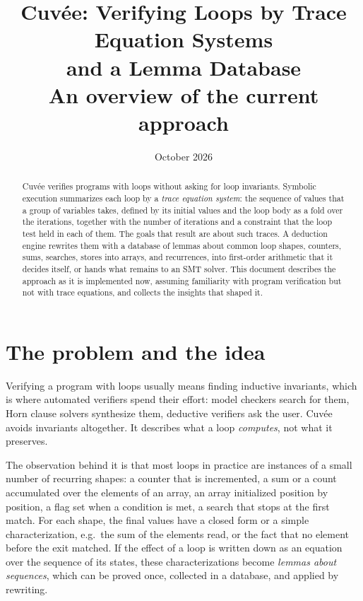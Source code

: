\documentclass[a4paper,11pt]{article}
\title{Cuvée: Verifying Loops by Trace Equation Systems\\and a Lemma Database\\[0.5ex]\large An overview of the
current approach}
\date{October 2026}
\newcommand{\cuvee}{Cuvée}
\begin{document}
\maketitle

\begin{abstract}
\cuvee{} verifies programs with loops without asking for loop invariants. Symbolic execution summarizes each loop
by a \emph{trace equation system}: the sequence of values that a group of variables takes, defined by its initial
values and the loop body as a fold over the iterations, together with the number of iterations and a constraint
that the loop test held in each of them. The goals that result are about such traces. A deduction engine rewrites
them with a database of lemmas about common loop shapes, counters, sums, searches, stores into arrays, and
recurrences, into first-order arithmetic that it decides itself, or hands what remains to an SMT solver. This
document describes the approach as it is implemented now, assuming familiarity with program verification but not
with trace equations, and collects the insights that shaped it.
\end{abstract}

\section{The problem and the idea}

Verifying a program with loops usually means finding inductive invariants, which is where automated verifiers
spend their effort: model checkers search for them, Horn clause solvers synthesize them, deductive verifiers ask the
user. \cuvee{} avoids invariants altogether. It describes what a loop \emph{computes}, not what it preserves.

The observation behind it is that most loops in practice are instances of a small number of recurring shapes: a
counter that is incremented, a sum or a count accumulated over the elements of an array, an array initialized
position by position, a flag set when a condition is met, a search that stops at the first match. For each shape,
the final values have a closed form or a simple characterization, e.g.\ the sum of the elements read, or the fact
that no element before the exit matched. If the effect of a loop is written down as an equation over the sequence
of its states, these characterizations become \emph{lemmas about sequences}, which can be proved once, collected in
a database, and applied by rewriting.
\end{document}
